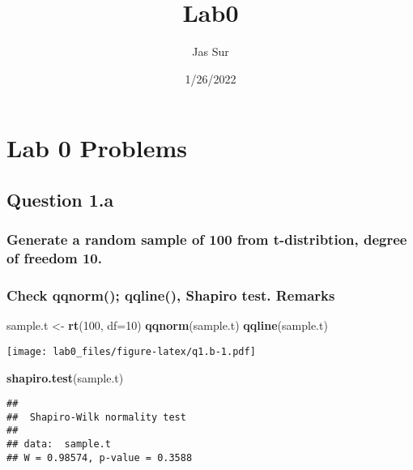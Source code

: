 \documentclass[
]{article}
\title{Lab0}
\author{Jas Sur}
\date{1/26/2022}
\newenvironment{Shaded}{\begin{snugshade}}{\end{snugshade}}
\newcommand{\DataTypeTok}[1]{\textcolor[rgb]{0.13,0.29,0.53}{#1}}
\newcommand{\DecValTok}[1]{\textcolor[rgb]{0.00,0.00,0.81}{#1}}
\newcommand{\KeywordTok}[1]{\textcolor[rgb]{0.13,0.29,0.53}{\textbf{#1}}}
\newcommand{\NormalTok}[1]{#1}
\newcommand{\StringTok}[1]{\textcolor[rgb]{0.31,0.60,0.02}{#1}}
\begin{document}
\maketitle

\hypertarget{lab-0-problems}{%
\section{Lab 0 Problems}\label{lab-0-problems}}

\hypertarget{question-1.a}{%
\subsection{Question 1.a}\label{question-1.a}}

\hypertarget{generate-a-random-sample-of-100-from-t-distribtion-degree-of-freedom-10.}{%
\subsubsection{Generate a random sample of 100 from t-distribtion,
degree of freedom
10.}\label{generate-a-random-sample-of-100-from-t-distribtion-degree-of-freedom-10.}}

\hypertarget{check-qqnorm-qqline-shapiro-test.-remarks}{%
\subsubsection{Check qqnorm(); qqline(), Shapiro test.
Remarks}\label{check-qqnorm-qqline-shapiro-test.-remarks}}

\begin{Shaded}
\begin{Highlighting}[]
\NormalTok{sample.t <-}\StringTok{ }\KeywordTok{rt}\NormalTok{(}\DecValTok{100}\NormalTok{, }\DataTypeTok{df=}\DecValTok{10}\NormalTok{)}
\KeywordTok{qqnorm}\NormalTok{(sample.t)}
\KeywordTok{qqline}\NormalTok{(sample.t)}
\end{Highlighting}
\end{Shaded}

\texttt{[image: lab0\_files/figure-latex/q1.b-1.pdf]}

\begin{Shaded}
\begin{Highlighting}[]
\KeywordTok{shapiro.test}\NormalTok{(sample.t)}
\end{Highlighting}
\end{Shaded}

\begin{verbatim}
## 
##  Shapiro-Wilk normality test
## 
## data:  sample.t
## W = 0.98574, p-value = 0.3588
\end{verbatim}
\end{document}
